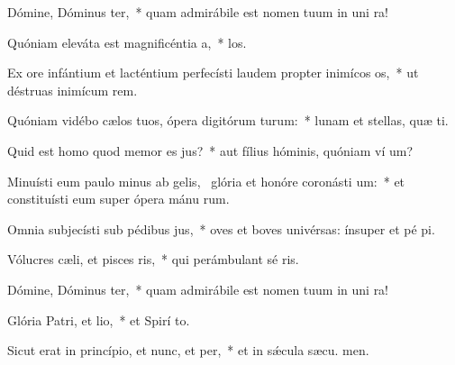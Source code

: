 \item Dómine, Dóminus ter,~* quam admirábile est nomen tuum in uni ra!
\item Quóniam eleváta est magnificéntia a,~*  los.
\item Ex ore infántium et lacténtium perfecísti laudem propter inimícos os,~* ut déstruas inimícum  rem.
\item Quóniam vidébo cælos tuos, ópera digitórum turum:~* lunam et stellas, quæ  ti.
\item Quid est homo quod memor es jus?~* aut fílius hóminis, quóniam ví um?
\item Minuísti eum paulo minus ab gelis,~\pscross{} glória et honóre coronásti um:~* et constituísti eum super ópera mánu rum.
\item Omnia subjecísti sub pédibus jus,~* oves et boves univérsas: ínsuper et pé pi.
\item Vólucres cæli, et pisces ris,~* qui perámbulant sé ris.
\item Dómine, Dóminus ter,~* quam admirábile est nomen tuum in uni ra!
\item Glória Patri, et lio,~* et Spirí to.
\item Sicut erat in princípio, et nunc, et per,~* et in sǽcula sæcu. men.
